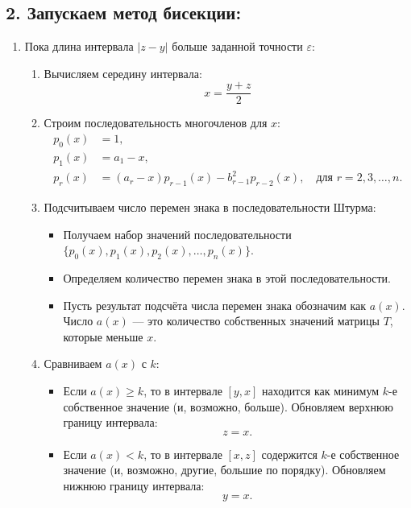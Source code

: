 \documentclass{article}
\begin{document}
\subsection*{2. Запускаем метод бисекции:}
\begin{enumerate}
    \item Пока длина интервала $|z - y|$ больше заданной точности $\varepsilon$:
    \begin{enumerate}
        \item Вычисляем середину интервала:
        \[
        x = \frac{y + z}{2}
        \]
        
        \item Строим последовательность многочленов для $x$:
        \begin{align*}
            p_0(x) &= 1, \\
            p_1(x) &= a_1 - x, \\
            p_r(x) &= (a_r - x)p_{r-1}(x) - b_{r-1}^2 p_{r-2}(x), \quad \text{для } r = 2, 3, \dots, n.
        \end{align*}
        
        \item Подсчитываем число перемен знака в последовательности Штурма:
        \begin{itemize}
            \item Получаем набор значений последовательности $\{p_0(x), p_1(x), p_2(x), \dots, p_n(x)\}$.
            \item Определяем количество перемен знака в этой последовательности.
            \item Пусть результат подсчёта числа перемен знака обозначим как $a(x)$. Число $a(x)$ — это количество собственных значений матрицы $T$, которые меньше $x$.
        \end{itemize}
        
        \item Сравниваем $a(x)$ с $k$:
        \begin{itemize}
            \item Если $a(x) \geq k$, то в интервале $[y, x]$ находится как минимум $k$-е собственное значение (и, возможно, больше). Обновляем верхнюю границу интервала:
            \[
            z = x.
            \]
            \item Если $a(x) < k$, то в интервале $[x, z]$ содержится $k$-е собственное значение (и, возможно, другие, большие по порядку). Обновляем нижнюю границу интервала:
            \[
            y = x.
            \]
        \end{itemize}
    \end{enumerate}
\end{enumerate}
\end{document}
